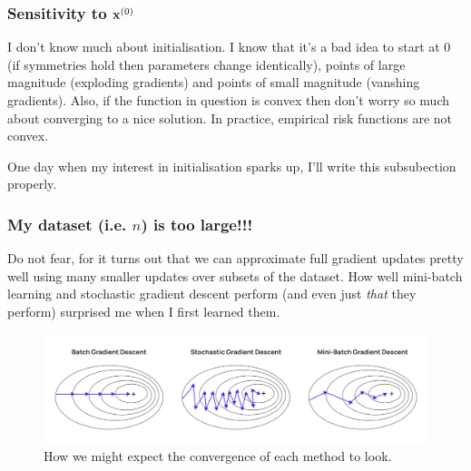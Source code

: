 \documentclass[11pt]{article}
\begin{document}

\subsubsection{Sensitivity to $\mathbf{x}^{(0)}$}
I don't know much about initialisation. I know that it's a bad idea to start at 0 (if symmetries hold then parameters change identically), points of large magnitude (exploding gradients) and points of small magnitude (vanshing gradients). Also, if the function in question is convex then don't worry so much about converging to a nice solution. In practice, empirical risk functions are not convex.

One day when my interest in initialisation sparks up, I'll write this subsubection properly.

\subsubsection{My dataset (i.e. $n$) is too large!!!}
Do not fear, for it turns out that we can approximate full gradient updates pretty well using many smaller updates over subsets of the dataset. How well mini-batch learning and stochastic gradient descent perform (and even just \textit{that} they perform) surprised me when I first learned them.

\begin{figure}[ht]
    \centering
    \includegraphics[width=\columnwidth]{./figures/gradient_descent/gradient_descent_types.png}
    \caption{How we might expect the convergence of each method to look.}
    \label{fig:gradient_descent_types}
\end{figure}
\end{document}
